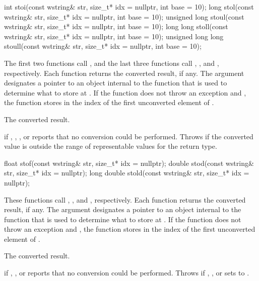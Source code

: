 %
%
%
%
%
\begin{itemdecl}
int stoi(const wstring& str, size_t* idx = nullptr, int base = 10);
long stol(const wstring& str, size_t* idx = nullptr, int base = 10);
unsigned long stoul(const wstring& str, size_t* idx = nullptr, int base = 10);
long long stoll(const wstring& str, size_t* idx = nullptr, int base = 10);
unsigned long long stoull(const wstring& str, size_t* idx = nullptr, int base = 10);
\end{itemdecl}

\begin{itemdescr}
\pnum
\effects The first two functions call ,
and the last three functions call ,
, and , respectively. Each function returns the converted result, if any. The
argument  designates a pointer to an object internal to the function
that is used to determine what to store at . If the function does
not throw an exception and , the function stores in 
the index of the first unconverted element of .

\pnum
\returns The converted result.

\pnum
\throws {} if , , , or
 reports that no conversion could be performed. Throws
 if the converted value is outside the range of representable values
for the return type.
\end{itemdescr}

%
%
%
\begin{itemdecl}
float stof(const wstring& str, size_t* idx = nullptr);
double stod(const wstring& str, size_t* idx = nullptr);
long double stold(const wstring& str, size_t* idx = nullptr);
\end{itemdecl}

\begin{itemdescr}
\pnum
\effects These functions call ,
, and ,
respectively. Each function returns the converted
result, if any. The argument  designates a pointer to an object internal to
the function that is used to determine what to store at . If the function
does not throw an exception and , the function stores in 
the index of the first unconverted element of .

\pnum
\returns The converted result.

\pnum
\throws {} if , , or  reports that no
conversion could be performed. Throws  if , , or
 sets  to .
\end{itemdescr}


